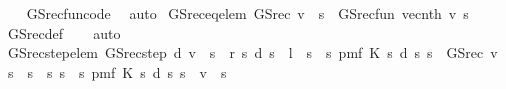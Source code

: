 \begin{isabellebody}
%
\isadelimproof
\ \ %
\endisadelimproof
%
\isatagproof
{}\isamarkupfalse%
\ GS{\isacharunderscore}{\kern0pt}rec{\isacharunderscore}{\kern0pt}fun{\isacharunderscore}{\kern0pt}code{\isacharprime}{\kern0pt}\ \isamarkupfalse%
\ auto%
\endisatagproof
{\isafoldproof}%
%
\isadelimproof
\isanewline
%
\endisadelimproof
\isanewline
{}\isamarkupfalse%
\ GS{\isacharunderscore}{\kern0pt}rec{\isacharunderscore}{\kern0pt}eq{\isacharunderscore}{\kern0pt}elem{\isacharcolon}{\kern0pt}\ {\isachardoublequoteopen}GS{\isacharunderscore}{\kern0pt}rec\ v\ {\isachardollar}{\kern0pt}\ s\ {\isacharequal}{\kern0pt}\ GS{\isacharunderscore}{\kern0pt}rec{\isacharunderscore}{\kern0pt}fun\ {\isacharparenleft}{\kern0pt}vec{\isacharunderscore}{\kern0pt}nth\ v{\isacharparenright}{\kern0pt}\ s{\isachardoublequoteclose}\isanewline
%
\isadelimproof
\ \ %
\endisadelimproof
%
\isatagproof
{}\isamarkupfalse%
\ GS{\isacharunderscore}{\kern0pt}rec{\isacharunderscore}{\kern0pt}def\isanewline
\ \ \isamarkupfalse%
\ auto%
\endisatagproof
{\isafoldproof}%
%
\isadelimproof
\isanewline
%
\endisadelimproof
\isanewline
\isanewline
\isanewline
{}\isamarkupfalse%
\ GS{\isacharunderscore}{\kern0pt}rec{\isacharunderscore}{\kern0pt}step{\isacharunderscore}{\kern0pt}elem{\isacharcolon}{\kern0pt}\ {\isachardoublequoteopen}GS{\isacharunderscore}{\kern0pt}rec{\isacharunderscore}{\kern0pt}step\ d\ v\ {\isachardollar}{\kern0pt}\ s\ {\isacharequal}{\kern0pt}\ r\ {\isacharparenleft}{\kern0pt}s{\isacharcomma}{\kern0pt}\ d\ s{\isacharparenright}{\kern0pt}\ {\isacharplus}{\kern0pt}\ l\ {\isacharasterisk}{\kern0pt}\ {\isacharparenleft}{\kern0pt}{\isacharparenleft}{\kern0pt}{\isasymSum}s{\isacharprime}{\kern0pt}\ {\isacharless}{\kern0pt}\ s{\isachardot}{\kern0pt}\ pmf\ {\isacharparenleft}{\kern0pt}K\ {\isacharparenleft}{\kern0pt}s{\isacharcomma}{\kern0pt}\ d\ s{\isacharparenright}{\kern0pt}{\isacharparenright}{\kern0pt}\ s{\isacharprime}{\kern0pt}\ {\isacharasterisk}{\kern0pt}\ GS{\isacharunderscore}{\kern0pt}rec\ v\ {\isachardollar}{\kern0pt}\ s{\isacharprime}{\kern0pt}{\isacharparenright}{\kern0pt}\ {\isacharplus}{\kern0pt}\ {\isacharparenleft}{\kern0pt}{\isasymSum}s{\isacharprime}{\kern0pt}\ {\isasymin}\ {\isacharbraceleft}{\kern0pt}s{\isacharprime}{\kern0pt}{\isachardot}{\kern0pt}\ s\ {\isasymle}\ s{\isacharprime}{\kern0pt}{\isacharbraceright}{\kern0pt}{\isachardot}{\kern0pt}\ pmf\ {\isacharparenleft}{\kern0pt}K\ {\isacharparenleft}{\kern0pt}s{\isacharcomma}{\kern0pt}\ d\ s{\isacharparenright}{\kern0pt}{\isacharparenright}{\kern0pt}\ s{\isacharprime}{\kern0pt}\ {\isacharasterisk}{\kern0pt}\ v\ {\isachardollar}{\kern0pt}\ s{\isacharprime}{\kern0pt}{\isacharparenright}{\kern0pt}{\isacharparenright}{\kern0pt}{\isachardoublequoteclose}\isanewline

\end{isabellebody}
